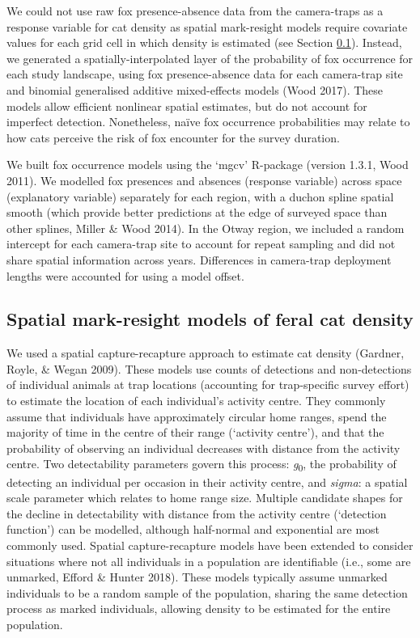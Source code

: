 \documentclass[preprint, 3p, authoryear]{elsarticle} %
\begin{document}
We could not use raw fox presence-absence data from the camera-traps as a response variable for cat density as spatial mark-resight models require covariate values for each grid cell in which density is estimated (see Section \ref{density-methods-smr}). Instead, we generated a spatially-interpolated layer of the probability of fox occurrence for each study landscape, using fox presence-absence data for each camera-trap site and binomial generalised additive mixed-effects models (Wood 2017). These models allow efficient nonlinear spatial estimates, but do not account for imperfect detection. Nonetheless, naïve fox occurrence probabilities may relate to how cats perceive the risk of fox encounter for the survey duration.

We built fox occurrence models using the `mgcv' R-package (version 1.3.1, Wood 2011). We modelled fox presences and absences (response variable) across space (explanatory variable) separately for each region, with a duchon spline spatial smooth (which provide better predictions at the edge of surveyed space than other splines, Miller \& Wood 2014). In the Otway region, we included a random intercept for each camera-trap site to account for repeat sampling and did not share spatial information across years. Differences in camera-trap deployment lengths were accounted for using a model offset.

\hypertarget{density-methods-smr}{%
\subsection{Spatial mark-resight models of feral cat density}\label{density-methods-smr}}

We used a spatial capture-recapture approach to estimate cat density (Gardner, Royle, \& Wegan 2009). These models use counts of detections and non-detections of individual animals at trap locations (accounting for trap-specific survey effort) to estimate the location of each individual's activity centre. They commonly assume that individuals have approximately circular home ranges, spend the majority of time in the centre of their range (`activity centre'), and that the probability of observing an individual decreases with distance from the activity centre. Two detectability parameters govern this process: \emph{g}\textsubscript{0}, the probability of detecting an individual per occasion in their activity centre, and \emph{sigma}: a spatial scale parameter which relates to home range size. Multiple candidate shapes for the decline in detectability with distance from the activity centre (`detection function') can be modelled, although half-normal and exponential are most commonly used. Spatial capture-recapture models have been extended to consider situations where not all individuals in a population are identifiable (i.e., some are unmarked, Efford \& Hunter 2018). These models typically assume unmarked individuals to be a random sample of the population, sharing the same detection process as marked individuals, allowing density to be estimated for the entire population.
\end{document}
